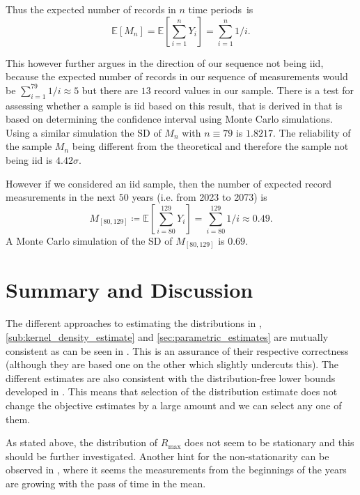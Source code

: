 Thus the expected number of records in \(n\) time periods~is \[
    \mathbb{E}[M_n] = \mathbb{E}\left[ \sum_{i = 1}^{n} Y_i \right] = \sum_{i = 1}^{n} 1/i.
\] 

This however further argues in the direction of our sequence not being \ac{iid}, because the expected number of records
in our sequence of measurements would be \(\sum_{i = 1}^{79} 1/i \approx 5\) but there are \(13\) record values in our
sample. There is a test for assessing whether a sample is \ac{iid} based on this result, that is derived in
\cite{benestadRecordvaluesNonstationarityTests2004} that is based on determining the confidence interval using Monte
Carlo simulations. Using a similar simulation the \ac{SD} of \(M_n\) with \(n \equiv 79\) is \(1.8217\). The reliability
of the sample \(M_n\) being different from the theoretical and therefore the sample not being \ac{iid} is
\(4.42\sigma\).

However if we considered an \ac{iid} sample, then the number of expected record measurements in the next \(50\) years
(i.e. from 2023 to 2073) is \[
    M_{[80,129]} \coloneqq \mathbb{E}\left[ \sum_{i = 80}^{129} Y_i \right] = \sum_{i = 80}^{129} 1/i \approx 0.49.
\] 
A Monte Carlo simulation of the \ac{SD} of \(M_{[80,129]}\) is \(0.69\).


\section{Summary and Discussion}%
\label{sec:summary}

The different approaches to estimating the distributions in
, \ref{sub:kernel_density_estimate} and \ref{sec:parametric_estimates}
are mutually consistent as can be seen in
. This is an assurance of their respective correctness (although they are based one on the
other which slightly undercuts this). The different estimates are also consistent with the distribution-free lower bounds
developed in . This means that selection of the distribution estimate does not
change the objective estimates by a large amount and we can select any one of them.

As stated above, the distribution of \(R_\text{max}\) does not seem to be stationary and this should be further
investigated. Another hint for the non-stationarity can be observed in , where it
seems the measurements from the beginnings of the years are growing with the pass of time in the mean.

